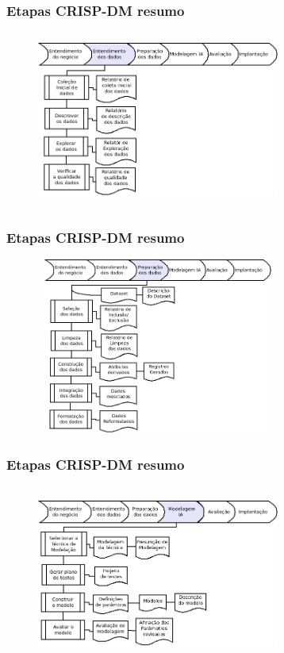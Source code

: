\documentclass[11pt]{beamer}
\begin{document}
\begin{frame}\frametitle{ Etapas CRISP-DM resumo}
	\transdissolve[duration=1, direction=25]
	\begin{figure}[!ht]
		\includegraphics[width=80mm, height=58mm]{Figuras/Crisp/EntendDados.png}
	\end{figure}
\end{frame}

\begin{frame}\frametitle{ Etapas CRISP-DM resumo}
	\transdissolve[duration=1, direction=25]
	\begin{figure}[!ht]
		\includegraphics[width=80mm, height=58mm]{Figuras/Crisp/PreparaDados.png}
	\end{figure}
\end{frame}

\begin{frame}\frametitle{ Etapas CRISP-DM resumo}
	\transdissolve[duration=1, direction=25]
	\begin{figure}[!ht]
		\includegraphics[width=80mm, height=58mm]{Figuras/Crisp/Model_IA.png}
	\end{figure}
\end{frame}
\end{document}
